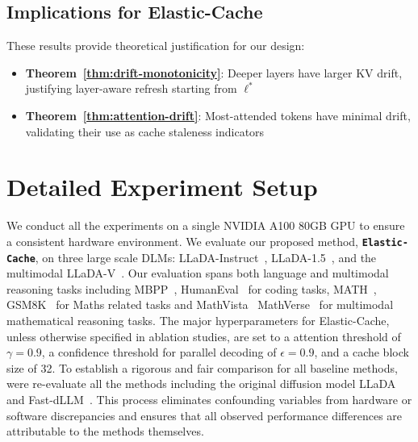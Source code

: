 \documentclass{article} %
\theoremstyle{definition}
\theoremstyle{remark}
\begin{document}
\subsection{Implications for Elastic-Cache}

These results provide theoretical justification for our design:
\begin{itemize}
\item \textbf{Theorem~\ref{thm:drift-monotonicity}}: Deeper layers have larger KV drift, justifying layer-aware refresh starting from $\ell^*$
\item \textbf{Theorem~\ref{thm:attention-drift}}: Most-attended tokens have minimal drift, validating their use as cache staleness indicators
\end{itemize}


\section{Detailed Experiment Setup}
We conduct all the experiments on a single NVIDIA A100 80GB GPU to ensure a consistent hardware environment. We evaluate our proposed method, \textbf{\texttt{Elastic-Cache}}, on three large scale DLMs: LLaDA-Instruct~\citep{nie2025large}, LLaDA-1.5~\citep{zhu2025llada15variancereducedpreference}, and the multimodal LLaDA-V~\citep{you2025llada}. Our evaluation spans both language and multimodal reasoning tasks including MBPP~\citep{austin2021program}, HumanEval~\citep{chen2021evaluating} for coding tasks, MATH~\citep{hendrycks2021measuring}, GSM8K~\citep{cobbe2021training} for Maths related tasks and MathVista~\citep{lu2023mathvista} MathVerse~\citep{zhang2024mathverse} for multimodal mathematical reasoning tasks. The major hyperparameters for Elastic-Cache, unless otherwise specified in ablation studies, are set to a attention threshold of $\gamma=0.9$, a confidence threshold for parallel decoding of $\epsilon=0.9$, and a cache block size of 32. To establish a rigorous and fair comparison for all baseline methods, were re-evaluate all the methods including the original diffusion model LLaDA~\cite{nie2025large} and Fast-dLLM~\citep{wu2025fast}. This process eliminates confounding variables from hardware or software discrepancies and ensures that all observed performance differences are attributable to the methods themselves.
\end{document}
